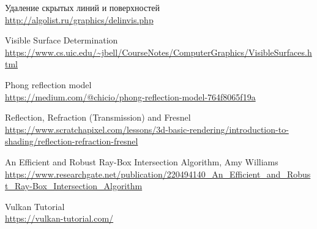 % 
% 


\begin{thebibliography}{9}
    
    Удаление скрытых линий и поверхностей
    \\\url{http://algolist.ru/graphics/delinvis.php}
    
    Visible Surface Determination
    \\\url{https://www.cs.uic.edu/~jbell/CourseNotes/ComputerGraphics/VisibleSurfaces.html}
    
    Phong reflection model
    \\\url{https://medium.com/@chicio/phong-reflection-model-764f8065f19a}
    
    Reflection, Refraction (Transmission) and Fresnel
    \\\url{https://www.scratchapixel.com/lessons/3d-basic-rendering/introduction-to-shading/reflection-refraction-fresnel}
    
    An Efficient and Robust Ray-Box Intersection Algorithm, Amy Williams
    \\\url{https://www.researchgate.net/publication/220494140_An_Efficient_and_Robust_Ray-Box_Intersection_Algorithm}

    Vulkan Tutorial
    \\\url{https://vulkan-tutorial.com/}



    


\end{thebibliography}
